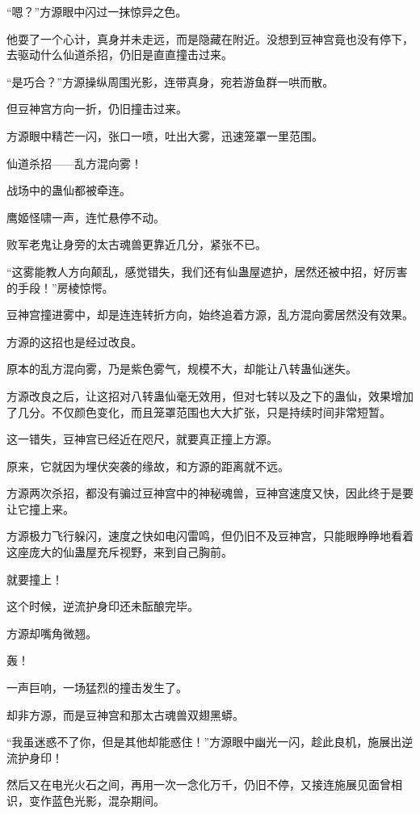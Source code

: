 \begin{this_body}
“嗯？”方源眼中闪过一抹惊异之色。

他耍了一个心计，真身并未走远，而是隐藏在附近。没想到豆神宫竟也没有停下，去驱动什么仙道杀招，仍旧是直直撞击过来。

“是巧合？”方源操纵周围光影，连带真身，宛若游鱼群一哄而散。

但豆神宫方向一折，仍旧撞击过来。

方源眼中精芒一闪，张口一喷，吐出大雾，迅速笼罩一里范围。

仙道杀招——乱方混向雾！

战场中的蛊仙都被牵连。

鹰姬怪啸一声，连忙悬停不动。

败军老鬼让身旁的太古魂兽更靠近几分，紧张不已。

“这雾能教人方向颠乱，感觉错失，我们还有仙蛊屋遮护，居然还被中招，好厉害的手段！”房棱惊愕。

豆神宫撞进雾中，却是连连转折方向，始终追着方源，乱方混向雾居然没有效果。

方源的这招也是经过改良。

原本的乱方混向雾，乃是紫色雾气，规模不大，却能让八转蛊仙迷失。

方源改良之后，让这招对八转蛊仙毫无效用，但对七转以及之下的蛊仙，效果增加了几分。不仅颜色变化，而且笼罩范围也大大扩张，只是持续时间非常短暂。

这一错失，豆神宫已经近在咫尺，就要真正撞上方源。

原来，它就因为埋伏突袭的缘故，和方源的距离就不远。

方源两次杀招，都没有骗过豆神宫中的神秘魂兽，豆神宫速度又快，因此终于是要让它撞上来。

方源极力飞行躲闪，速度之快如电闪雷鸣，但仍旧不及豆神宫，只能眼睁睁地看着这座庞大的仙蛊屋充斥视野，来到自己胸前。

就要撞上！

这个时候，逆流护身印还未酝酿完毕。

方源却嘴角微翘。

轰！

一声巨响，一场猛烈的撞击发生了。

却非方源，而是豆神宫和那太古魂兽双翅黑蟒。

“我虽迷惑不了你，但是其他却能惑住！”方源眼中幽光一闪，趁此良机，施展出逆流护身印！

然后又在电光火石之间，再用一次一念化万千，仍旧不停，又接连施展见面曾相识，变作蓝色光影，混杂期间。


\end{this_body}
